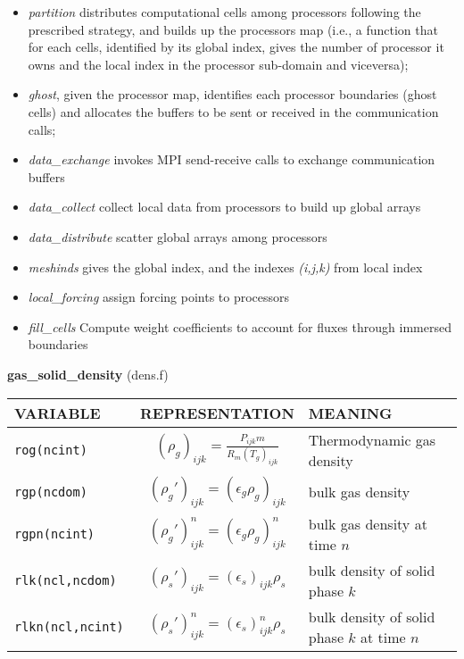 \begin{itemize}
\item{\em partition} distributes computational cells among processors following the 
prescribed strategy, and builds up the processors map (i.e., a function that
 for each cells, identified by its global index, gives the number of 
processor it owns and the local index in the processor sub-domain and viceversa);
\item{\em ghost}, given the processor map, identifies each processor boundaries 
(ghost cells) and
allocates the buffers to be sent or received in the communication calls;
\item{\em data\_exchange} invokes MPI send-receive calls to exchange communication 
 buffers
\item{\em data\_collect} collect local data from processors to build up global arrays
\item{\em data\_distribute} scatter global arrays among processors
\item{\em meshinds} gives the global index, and the indexes {\em (i,j,k)} from local index
\item{\em local\_forcing} assign forcing points to processors
\item{\em fill\_cells} Compute weight coefficients to account for fluxes through immersed boundaries
\end{itemize}
%
%
{\large {\bf gas\_solid\_density}} (dens.f)\\[5mm]
\begin{tabular}{|p{6cm}|c|p{6cm}|}\hline
VARIABLE & REPRESENTATION & MEANING\\\hline
\tt rog(ncint) & $(\rho_g)_{ijk}=\frac{P_{ijk}m}{R_m(T_g)_{ijk}}$ &  Thermodynamic gas density \\\hline
\tt rgp(ncdom) & $(\rho_g')_{ijk}=(\epsilon_g\rho_g)_{ijk} $&  bulk gas density \\\hline
\tt rgpn(ncint) & $(\rho_g')^{n}_{ijk}=(\epsilon_g\rho_g)^{n}_{ijk} $&  bulk gas density at time $n$ \\\hline
\tt rlk(ncl,ncdom) & $(\rho_s')_{ijk}=(\epsilon_s)_{ijk}\rho_s$ &  bulk density of solid phase $k$ \\\hline
\tt rlkn(ncl,ncint) & $(\rho_s')^{n}_{ijk}=(\epsilon_s)^{n}_{ijk}\rho_s$ &  bulk density of solid phase $k$ at time $n$\\\hline
\end{tabular}\\[5mm]
